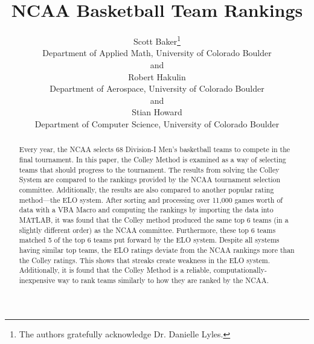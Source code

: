 \documentclass[12pt]{article}
\begin{document}
\def\spacingset#1{\renewcommand{\baselinestretch}%
{#1}\small\normalsize} \spacingset{1}






  \title{\bf NCAA Basketball Team Rankings}
  \author{Scott Baker\thanks{
    The authors gratefully acknowledge Dr. Danielle Lyles.}\hspace{.2cm}\\
    Department of Applied Math, University of Colorado Boulder\\
    and \\
    Robert Hakulin \\
    Department of Aerospace, University of Colorado Boulder\\
    and \\
    Stian Howard \\
    Department of Computer Science, University of Colorado Boulder\\}
  \maketitle


\begin{abstract}
Every year, the NCAA selects 68 Division-I Men's basketball teams to compete in the final tournament. In this paper, the Colley Method is examined as a way of selecting teams that should progress to the tournament. The results from solving the Colley System are compared to the rankings provided by the NCAA tournament selection committee. Additionally, the results are also compared to another popular rating method---the ELO system. After sorting and processing over 11,000 games worth of data with a VBA Macro and computing the rankings by importing the data into MATLAB, it was found that the Colley method produced the same top 6 teams (in a slightly different order) as the NCAA committee. Furthermore,  these top 6 teams matched 5 of the top 6 teams put forward by the ELO system. Despite all systems having similar top teams, the ELO ratings deviate from the NCAA rankings more than the Colley ratings. This shows that streaks create weakness in the ELO system. Additionally, it is found that the Colley Method is a reliable, computationally-inexpensive way to rank teams similarly to how they are ranked by the NCAA.
\end{abstract}
\end{document}
